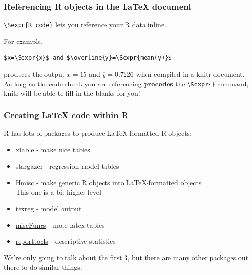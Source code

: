 \documentclass{beamer}\usepackage[]{graphicx}\usepackage[]{color}
\makeatletter
\newenvironment{kframe}{%
 \def\at@end@of@kframe{}%
 \ifinner\ifhmode%
  \def\at@end@of@kframe{\end{minipage}}%
  \begin{minipage}{\columnwidth}%
 \fi\fi%
 \def\FrameCommand##1{\hskip\@totalleftmargin \hskip-\fboxsep
 \colorbox{shadecolor}{##1}\hskip-\fboxsep
     \hskip-\linewidth \hskip-\@totalleftmargin \hskip\columnwidth}%
 \MakeFramed {\advance\hsize-\width
   \@totalleftmargin\z@ \linewidth\hsize
   \@setminipage}}%
 {\par\unskip\endMakeFramed%
 \at@end@of@kframe}
\newenvironment{knitrout}{}{} %
\makeatother
\begin{document}
\begin{frame}[fragile]
\frametitle{Referencing R objects in the LaTeX document}
\texttt{\textbackslash Sexpr\{R code\}} lets you reference your R data inline. \bigskip\bigskip

For example,
\begin{knitrout}\footnotesize
{}\color{fgcolor}\begin{kframe}
\begin{verbatim}
$x=\Sexpr{x}$ and $\overline{y}=\Sexpr{mean(y)}$
\end{verbatim}
\end{kframe}
\end{knitrout}

produces the output $x=15$ and $\overline{y}=0.7226$ when compiled in a knitr document. As long as the code chunk you are referencing \textbf{precedes} the \texttt{\textbackslash Sexpr\{\}} command, knitr will be able to fill in the blanks for you!

\end{frame}


\begin{frame}[fragile]
\frametitle{Creating LaTeX code within R}
R has lots of packages to produce LaTeX formatted R objects: 
\begin{itemize}
\item \href{http://cran.r-project.org/web/packages/xtable/index.html}{xtable} - make nice tables
\item \href{http://cran.r-project.org/web/packages/stargazer/index.html}{stargazer} - regression model tables
\item \href{http://cran.r-project.org/web/packages/Hmisc/index.html}{Hmisc} - make generic R objects into LaTeX-formatted objects\\
This one is a bit higher-level
\item \href{http://cran.r-project.org/web/packages/texreg/index.html}{texreg} - model output
\item \href{http://cran.r-project.org/web/packages/miscFuncs/index.html}{miscFuncs} - more latex tables
\item \href{http://cran.r-project.org/web/packages/reporttools/index.html}{reporttools} - descriptive statistics
\end{itemize}

We're only going to talk about the first 3, but there are many other packages out there to do similar things.
\end{frame}
\end{document}
